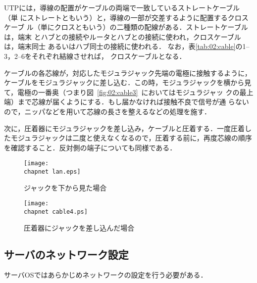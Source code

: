 UTPには，導線の配置がケーブルの両端で一致しているストレートケーブル（単
にストレートともいう）と，導線の一部が交差するように配置するクロスケーブ
ル（単にクロスともいう）の二種類の配線がある．ストレートケーブルは，端末
とハブとの接続やルータとハブとの接続に使われ，クロスケーブルは，端末同士
あるいはハブ同士の接続に使われる．
なお，表\ref{tab:02:cable}の1--3，2--6をそれぞれ結線させれば，
クロスケーブルとなる．

ケーブルの各芯線が，対応したモジュラジャック先端の電極に接触するように，
ケーブルをモジュラジャックに差し込む．この時，モジュラジャックを横から見
て，電極の一番奥（つまり図~\ref{fig:02:cable3}~においてはモジュラジャッ
クの最上端）まで芯線が届くようにする．もし届かなければ接触不良で信号が通
らないので，ニッパなどを用いて芯線の長さを整えるなどの処理を施す．

次に，圧着器にモジュラジャックを差し込み，ケーブルと圧着する．一度圧着し
たモジュラジャックは二度と使えなくなるので，圧着する前に，再度芯線の順序
を確認すること．反対側の端子についても同様である．

\begin{figure}
\begin{minipage}{.39\columnwidth}
\begin{center}
\texttt{[image: \\chapnet lan.eps]}
\vspace*{1zh}
\caption{ジャックを下から見た場合}
\label{fig:02:cable3}
\end{center}
\end{minipage}
\begin{minipage}{.6\columnwidth}
\begin{center}
\texttt{[image: \\chapnet cable4.ps]}
\vspace*{1zh}
\caption{圧着器にジャックを差し込んだ場合}
\label{fig:02:cable4}
\end{center}
\end{minipage}
\end{figure}

\subsection{サーバのネットワーク設定}
サーバOSではあらかじめネットワークの設定を行う必要がある．

